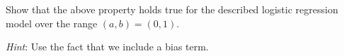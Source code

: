 \item {}
Show that the above property holds true for the described logistic regression
model over the range $(a,b) = (0,1)$.

\textit{Hint}: Use the fact that we include a bias term.

\ifnum{} {
  
} \fi
